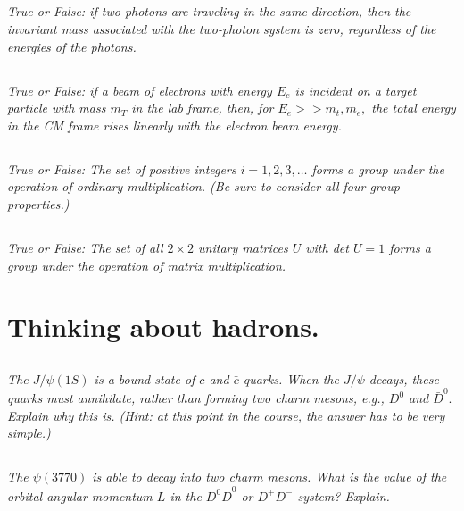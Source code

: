 \documentclass{article}
\begin{document}
\subsection{}
\textit{True or False: if two photons are traveling in the same direction, then the invariant mass associated with the two-photon system is zero, regardless of the energies of the photons.}

\subsection{}
\textit{True or False: if a beam of electrons with energy $E_{e}$ is incident on a target particle with mass $m_{T}$ in the lab frame, then, for $E_{e}>>m_{t}, m_{e},$ the total energy in the CM frame rises linearly with the electron beam energy.}


\subsection{}
\textit{ True or False: The set of positive integers $i=1,2,3, \ldots$ forms a group under the operation of ordinary multiplication. (Be sure to consider all four group properties.)}

\subsection{}
\textit{ True or False: The set of all $2 \times 2$ unitary matrices $U$ with det $U=1$ forms a group under the operation of matrix multiplication.}


\newpage


\section{Thinking about hadrons.}
\subsection{}
\textit{The $J / \psi(1 S)$ is a bound state of $c$ and $\bar{c}$ quarks. When the $J / \psi$ decays, these quarks must annihilate, rather than forming two charm mesons, e.g., $D^{0}$ and $\bar{D}^{0} .$ Explain why this is. (Hint: at this point in the course, the answer has to be very simple.) }



\subsection{}
\textit{The $\psi(3770)$ is able to decay into two charm mesons. What is the value of the orbital angular momentum $L$ in the $D^{0} \bar{D}^{0}$ or $D^{+} D^{-}$ system? Explain. }      
\end{document}
